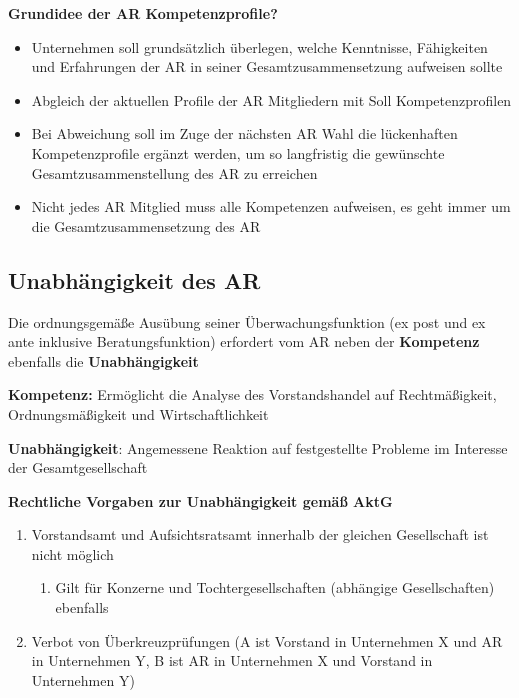\documentclass[
]{article}
\providecommand{\tightlist}{%
  \setlength{\itemsep}{0pt}\setlength{\parskip}{0pt}}
\begin{document}
\textbf{Grundidee der AR Kompetenzprofile?}

\begin{itemize}
\tightlist
\item
  Unternehmen soll grundsätzlich überlegen, welche Kenntnisse,
  Fähigkeiten und Erfahrungen der AR in seiner Gesamtzusammensetzung
  aufweisen sollte
\item
  Abgleich der aktuellen Profile der AR Mitgliedern mit Soll
  Kompetenzprofilen
\item
  Bei Abweichung soll im Zuge der nächsten AR Wahl die lückenhaften
  Kompetenzprofile ergänzt werden, um so langfristig die gewünschte
  Gesamtzusammenstellung des AR zu erreichen
\item
  Nicht jedes AR Mitglied muss alle Kompetenzen aufweisen, es geht immer
  um die Gesamtzusammensetzung des AR
\end{itemize}

\hypertarget{unabhuxe4ngigkeit-des-ar}{%
\subsection{Unabhängigkeit des AR}\label{unabhuxe4ngigkeit-des-ar}}

Die ordnungsgemäße Ausübung seiner Überwachungsfunktion (ex post und ex
ante inklusive Beratungsfunktion) erfordert vom AR neben der
\textbf{Kompetenz} ebenfalls die \textbf{Unabhängigkeit}

\textbf{Kompetenz: }Ermöglicht die Analyse des Vorstandshandel auf
Rechtmäßigkeit, Ordnungsmäßigkeit und Wirtschaftlichkeit

\textbf{Unabhängigkeit}: Angemessene Reaktion auf festgestellte Probleme
im Interesse der Gesamtgesellschaft

\textbf{Rechtliche Vorgaben zur Unabhängigkeit gemäß AktG}

\begin{enumerate}
\def\labelenumi{\arabic{enumi}.}
\item
  Vorstandsamt und Aufsichtsratsamt innerhalb der gleichen Gesellschaft
  ist nicht möglich

  \begin{enumerate}
  \def\labelenumii{\alph{enumii}.}
  \tightlist
  \item
    Gilt für Konzerne und Tochtergesellschaften (abhängige
    Gesellschaften) ebenfalls
  \end{enumerate}
\item
  Verbot von Überkreuzprüfungen (A ist Vorstand in Unternehmen X und AR
  in Unternehmen Y, B ist AR in Unternehmen X und Vorstand in
  Unternehmen Y)
\end{enumerate}
\end{document}
